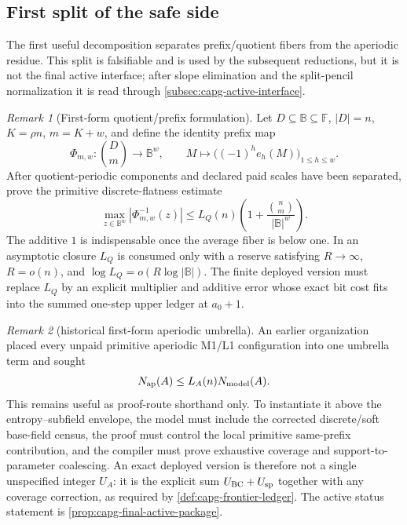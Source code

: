 \documentclass[11pt]{article}
\theoremstyle{definition}
\theoremstyle{remark}
\newtheorem{remark}[remark]{Remark}
\newcommand{\F}{\mathbb{F}}
\newcommand{\B}{\mathbb{B}}
\begin{document}
\subsection{First split of the safe side}\label{subsec:capfpr-AQ}

The first useful decomposition separates prefix/quotient fibers from the aperiodic residue.  This split is falsifiable and is used by the subsequent reductions, but it is not the final active interface; after slope elimination and the split-pencil normalization it is read through \cref{subsec:capg-active-interface}.

\begin{remark}[First-form quotient/prefix formulation]\label{prob:capfpr-Q}
Let $D\subseteq\B\subseteq\F$, $|D|=n$, $K=\rho n$, $m=K+w$, and define the identity prefix map
\[
        \Phi_{m,w}:\binom Dm\longrightarrow\B^w,
        \qquad
        M\longmapsto\bigl((-1)^h e_h(M)\bigr)_{1\le h\le w}.
\]
After quotient-periodic components and declared paid scales have been separated, prove the primitive discrete-flatness estimate
\[
        \max_{z\in\B^w}|\Phi_{m,w}^{-1}(z)|
        \le L_Q(n)\left(1+\frac{\binom n m}{|\B|^w}\right).
\]
The additive $1$ is indispensable once the average fiber is below one.  In an
asymptotic closure $L_Q$ is consumed only with a reserve satisfying
$R\to\infty$, $R=o(n)$, and $\log L_Q=o(R\log|\B|)$.  The finite deployed version must replace $L_Q$ by an
explicit multiplier and additive error whose exact bit cost fits into the
summed one-step upper ledger at $a_0+1$.
\end{remark}

\begin{remark}[historical first-form aperiodic umbrella]\label{prob:capfpr-A}
An earlier organization placed every unpaid primitive aperiodic M1/L1 configuration into one umbrella term and sought
\[
        N_{\rm ap}(A)\le L_A(n)N_{\rm model}(A).
\]
This remains useful as proof-route shorthand only.  To instantiate it above the entropy--subfield envelope, the model must include the corrected discrete/soft base-field census, the proof must control the local primitive same-prefix contribution, and the compiler must prove exhaustive coverage and support-to-parameter coalescing.  An exact deployed version is therefore not a single unspecified integer $U_A$: it is the explicit sum $U_{\rm BC}+U_{\rm sp}$ together with any coverage correction, as required by \cref{def:capg-frontier-ledger}.  The active status statement is \cref{prop:capg-final-active-package}.
\end{remark}
\end{document}
